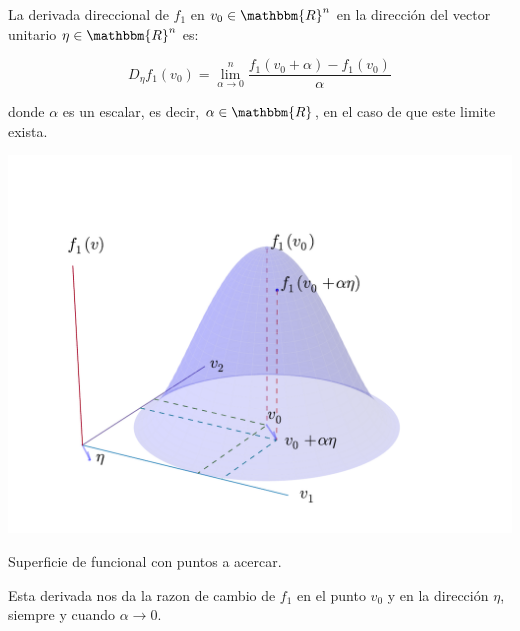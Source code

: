                 \begin{definicion}
                    La derivada direccional de $f_1$ en $v_0 \in \mathbbm{R}^n$ en la dirección del vector unitario $\eta \in \mathbbm{R}^n$ es:

                    \begin{equation}
                        D_{\eta} f_1(v_0) = \lim_{\alpha \to 0}^{n}  \frac{f_1(v_0 + \alpha) - f_1(v_0)}{\alpha}
                    \end{equation}

                    donde $\alpha$ es un escalar, es decir, $\alpha \in \mathbbm{R}$, en el caso de que este limite exista.

                    \begin{marginfigure}
                        \centering
                        \includegraphics[width=\textwidth]{./imagenes/superficie3d.pdf}
                        \caption{\label{fig:superficie3d}Superficie de funcional con puntos a acercar.}
                    \end{marginfigure}


                    Esta derivada nos da la razon de cambio de $f_1$ en el punto $v_0$ y en la dirección $\eta$, siempre y cuando $\alpha \to 0$.
                \end{definicion}

